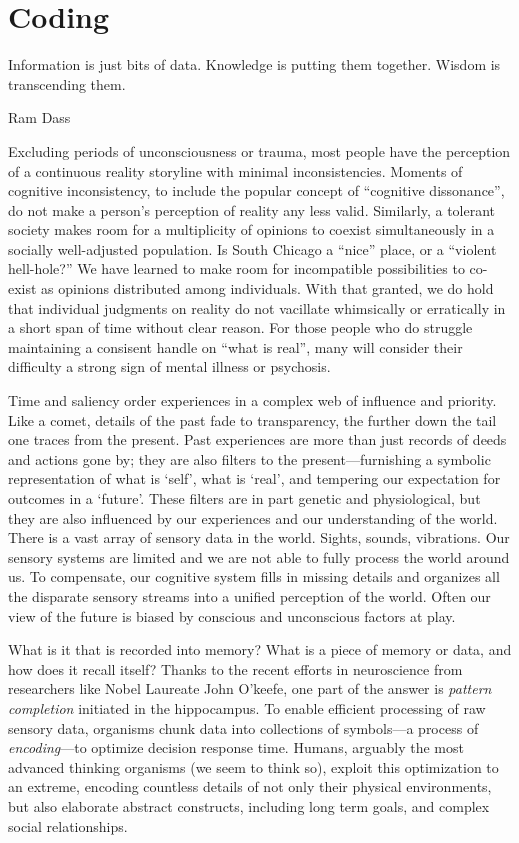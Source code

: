 \documentclass{UIdahoMastersThesis}
\begin{document}
\section{Coding}

\epigraph{Information is just bits of data. Knowledge is putting them together. Wisdom is transcending them.}{Ram Dass}

Excluding periods of unconsciousness or trauma, most people have the perception of a continuous reality storyline with minimal inconsistencies. Moments of cognitive inconsistency, to include the popular concept of ``cognitive dissonance'', do not make a person's perception of reality any less valid. Similarly, a tolerant society makes room for a multiplicity of opinions to coexist simultaneously in a socially well-adjusted population. Is South Chicago a ``nice'' place, or a ``violent hell-hole?'' We have learned to make room for incompatible  possibilities to co-exist as opinions distributed among individuals. With that granted, we do hold that individual judgments on reality do not vacillate whimsically or erratically in a short span of time without clear reason. For those people who do struggle maintaining a consisent handle on ``what is real'', many will consider their difficulty a strong sign of mental illness or psychosis.

Time and saliency order experiences in a complex web of influence and priority. Like a comet, details of the past fade to transparency, the further down the tail one traces from the present. Past experiences are more than just records of deeds and actions gone by; they are also filters to the present---furnishing a symbolic representation of what is `self', what is `real', and tempering our expectation for outcomes in a `future'. These filters are in part genetic and physiological, but they are also influenced by our experiences and our understanding of the world. There is a vast array of sensory data in the world. Sights, sounds, vibrations. Our sensory systems are limited and we are not able to fully process the world around us. To compensate, our cognitive system fills in missing details and organizes all the disparate sensory streams into a unified perception of the world. Often our view of the future is biased by conscious and unconscious factors at play.

What is it that is recorded into memory? What is a piece of memory or data, and how does it recall itself? Thanks to the recent efforts in neuroscience from researchers like Nobel Laureate John O'keefe, one part of the answer is \emph{pattern completion }initiated in the hippocampus. To enable efficient processing of raw sensory data, organisms chunk data into collections of symbols---a process of \emph{encoding}---to optimize decision response time. Humans, arguably the most advanced thinking organisms (we seem to think so), exploit this optimization to an extreme, encoding countless details of not only their physical environments, but also elaborate abstract constructs, including long term goals, and complex social relationships.
\end{document}

